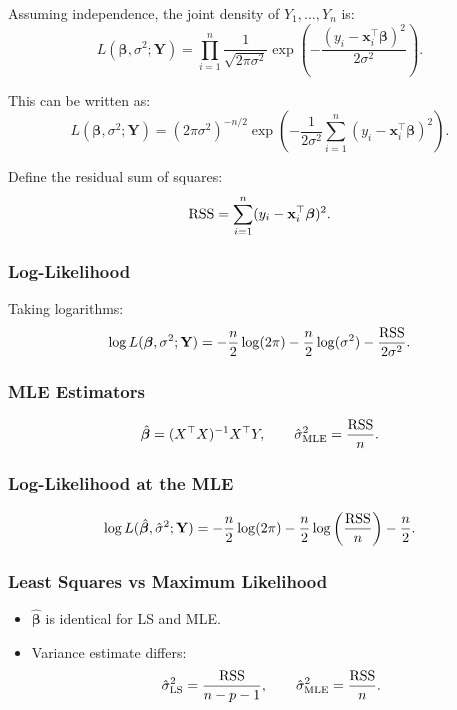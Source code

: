 Assuming independence, the joint density of $Y_1,\dots,Y_n$ is:
\[
L(\boldsymbol{\beta}, \sigma^2; \mathbf{Y})
=
\prod_{i=1}^n \frac{1}{\sqrt{2\pi\sigma^2}}
\exp\left(
-\frac{(y_i - \mathbf{x}_i^\top \boldsymbol{\beta})^2}{2\sigma^2}
\right).
\]

This can be written as:
\[
L(\boldsymbol{\beta}, \sigma^2; \mathbf{Y})
=
(2\pi\sigma^2)^{-n/2}
\exp\left(
-\frac{1}{2\sigma^2}\sum_{i=1}^n (y_i - \mathbf{x}_i^\top \boldsymbol{\beta})^2
\right).
\]

Define the residual sum of squares:
\[
\mathrm{RSS} = \sum_{i=1}^n (y_i - \mathbf{x}_i^\top \boldsymbol{\beta})^2.
\]

\subsubsection*{Log-Likelihood}

Taking logarithms:
\[
\log L(\boldsymbol{\beta}, \sigma^2; \mathbf{Y})
=
-\frac{n}{2}\log(2\pi)
-\frac{n}{2}\log(\sigma^2)
-\frac{\mathrm{RSS}}{2\sigma^2}.
\]

\subsubsection*{MLE Estimators}

\begin{keyresult}
\[
\hat{\boldsymbol{\beta}} = (X^\top X)^{-1} X^\top Y,
\qquad
\hat{\sigma}^2_{\text{MLE}} = \frac{\mathrm{RSS}}{n}.
\]
\end{keyresult}

\subsubsection*{Log-Likelihood at the MLE}

\[
\log L(\hat{\boldsymbol{\beta}}, \hat{\sigma}^2; \mathbf{Y})
=
-\frac{n}{2}\log(2\pi)
-\frac{n}{2}\log\left(\frac{\mathrm{RSS}}{n}\right)
-\frac{n}{2}.
\]

\subsubsection*{Least Squares vs Maximum Likelihood}

\begin{notebox}
\begin{itemize}
\item $\hat{\boldsymbol{\beta}}$ is identical for LS and MLE.
\item Variance estimate differs:
\[
\hat{\sigma}^2_{\text{LS}} = \frac{\mathrm{RSS}}{n - p - 1},
\qquad
\hat{\sigma}^2_{\text{MLE}} = \frac{\mathrm{RSS}}{n}.
\]
\end{itemize}
\end{notebox}

